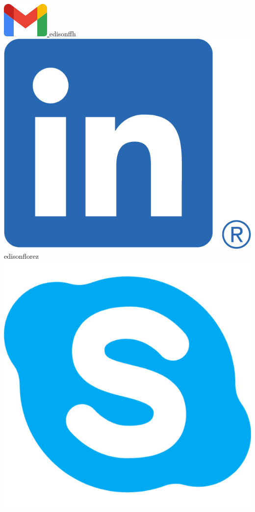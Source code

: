 \begin{center}
    \href{mailto:edisonffh@gmail.com}{
        \includegraphics[scale=0.25]{figs/gmail_icon.png}
    } edisonffh
    \hspace*{5mm}
    \href{https://www.linkedin.com/in/edisonflorez/}{
        \includegraphics[scale=0.1]{figs/linkedin_bug.png}
    } edisonflorez
    \hspace*{5mm}
    \includegraphics[scale=0.023]{figs/skype_logo.png}

\end{center}

